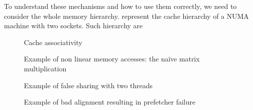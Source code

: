 To understand these mechanisms and how to use them correctly, we need to consider the whole memory hierarchy.
 represent the cache hierarchy of a \gls{NUMA} machine with two sockets.
Such hierarchy are 



\begin{figure}[htb]
    \centering
    \caption{Cache associativity}
    \label{fig:cache-assoc}
\end{figure}


\begin{figure}[htb]
    \centering
    
    \caption{Example of non linear memory accesses: the naïve matrix multiplication}
    \label{fig:mat-mult}
\end{figure}

\begin{figure}[htb]
    \centering
    \caption{Example of false sharing with two threads}
    \label{fig:false-sharing}
\end{figure}

\begin{figure}[htb]
    \centering
    \caption{Example of bad alignment resulting in prefetcher failure}
    \label{fig:bad-align}
\end{figure}

